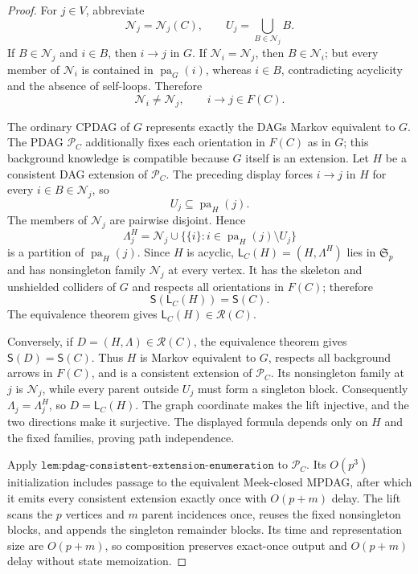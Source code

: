 \documentclass{article}
\begin{document}
\begin{proof}
For \(j\in V\), abbreviate
\[
 \mathcal N_j=\mathcal N_j(C),
 \qquad U_j=\bigcup_{B\in\mathcal N_j}B.
\]
If \(B\in\mathcal N_j\) and \(i\in B\), then \(i\to j\) in \(G\). If \(\mathcal N_i=\mathcal N_j\), then \(B\in\mathcal N_i\); but every member of \(\mathcal N_i\) is contained in \(\operatorname{pa}_G(i)\), whereas \(i\in B\), contradicting acyclicity and the absence of self-loops. Therefore
\[
 \mathcal N_i\neq\mathcal N_j,
 \qquad i\to j\in F(C).
\]

The ordinary CPDAG of \(G\) represents exactly the DAGs Markov equivalent to \(G\). The PDAG \(\mathcal P_C\) additionally fixes each orientation in \(F(C)\) as in \(G\); this background knowledge is compatible because \(G\) itself is an extension. Let \(H\) be a consistent DAG extension of \(\mathcal P_C\). The preceding display forces \(i\to j\) in \(H\) for every \(i\in B\in\mathcal N_j\), so
\[
 U_j\subseteq\operatorname{pa}_H(j).
\]
The members of \(\mathcal N_j\) are pairwise disjoint. Hence
\[
 \Lambda^H_j=\mathcal N_j\cup
 \{\{i\}:i\in\operatorname{pa}_H(j)\setminus U_j\}
\]
is a partition of \(\operatorname{pa}_H(j)\). Since \(H\) is acyclic, \(\mathsf L_C(H)=(H,\Lambda^H)\) lies in \(\mathfrak S_p\) and has nonsingleton family \(\mathcal N_j\) at every vertex. It has the skeleton and unshielded colliders of \(G\) and respects all orientations in \(F(C)\); therefore
\[
 \mathsf S(\mathsf L_C(H))=\mathsf S(C).
\]
The equivalence theorem gives \(\mathsf L_C(H)\in\mathcal R(C)\).

Conversely, if \(D=(H,\Lambda)\in\mathcal R(C)\), the equivalence theorem gives \(\mathsf S(D)=\mathsf S(C)\). Thus \(H\) is Markov equivalent to \(G\), respects all background arrows in \(F(C)\), and is a consistent extension of \(\mathcal P_C\). Its nonsingleton family at \(j\) is \(\mathcal N_j\), while every parent outside \(U_j\) must form a singleton block. Consequently \(\Lambda_j=\Lambda^H_j\), so \(D=\mathsf L_C(H)\). The graph coordinate makes the lift injective, and the two directions make it surjective. The displayed formula depends only on \(H\) and the fixed families, proving path independence.

Apply \(\texttt{lem:pdag-consistent-extension-enumeration}\) to \(\mathcal P_C\). Its \(O(p^3)\) initialization includes passage to the equivalent Meek-closed MPDAG, after which it emits every consistent extension exactly once with \(O(p+m)\) delay. The lift scans the \(p\) vertices and \(m\) parent incidences once, reuses the fixed nonsingleton blocks, and appends the singleton remainder blocks. Its time and representation size are \(O(p+m)\), so composition preserves exact-once output and \(O(p+m)\) delay without state memoization.


\end{proof}
\end{document}
